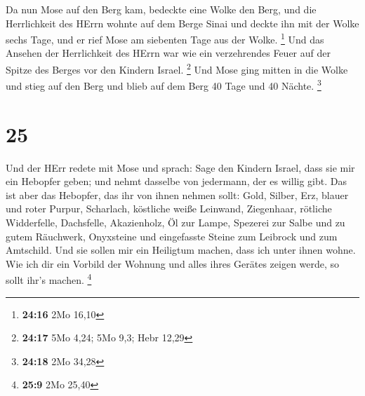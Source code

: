  Da nun Mose auf den Berg kam, bedeckte eine Wolke den
Berg,  und die Herrlichkeit des HErrn wohnte auf dem Berge
Sinai und deckte ihn mit der Wolke sechs Tage, und er rief Mose am
siebenten Tage aus der Wolke. \footnote{\textbf{24:16} 2Mo 16,10}
 Und das Ansehen der Herrlichkeit des HErrn war wie ein
verzehrendes Feuer auf der Spitze des Berges vor den Kindern Israel.
\footnote{\textbf{24:17} 5Mo 4,24; 5Mo 9,3; Hebr 12,29} 
Und Mose ging mitten in die Wolke und stieg auf den Berg und blieb auf
dem Berg 40 Tage und 40 Nächte. \footnote{\textbf{24:18} 2Mo 34,28}

\hypertarget{section-6}{%
\section{25}\label{section-6}}

 Und der HErr redete mit Mose und sprach:  Sage
den Kindern Israel, dass sie mir ein Hebopfer geben; und nehmt dasselbe
von jedermann, der es willig gibt.  Das ist aber das
Hebopfer, das ihr von ihnen nehmen sollt: Gold, Silber, Erz,
 blauer und roter Purpur, Scharlach, köstliche weiße
Leinwand, Ziegenhaar,  rötliche Widderfelle, Dachsfelle,
Akazienholz,  Öl zur Lampe, Spezerei zur Salbe und zu gutem
Räuchwerk,  Onyxsteine und eingefasste Steine zum Leibrock
und zum Amtschild.  Und sie sollen mir ein Heiligtum machen,
dass ich unter ihnen wohne.  Wie ich dir ein Vorbild der
Wohnung und alles ihres Gerätes zeigen werde, so sollt ihr's machen.
\footnote{\textbf{25:9} 2Mo 25,40}

